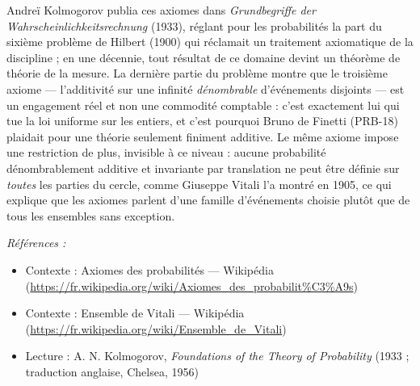 \documentclass[11pt]{article}
\newenvironment{refs}{\par\small\noindent\emph{Références :}\begin{itemize}\setlength\itemsep{0pt}}{\end{itemize}\normalsize}
\begin{document}
\noindent Andreï Kolmogorov publia ces axiomes dans \textit{Grundbegriffe der
Wahrscheinlichkeitsrechnung} (1933), réglant pour les probabilités la part du sixième problème
de Hilbert (1900) qui réclamait un traitement axiomatique de la discipline ; en une décennie, tout
résultat de ce domaine devint un théorème de théorie de la mesure. La dernière partie du problème
montre que le troisième axiome --- l'additivité sur une infinité \textit{dénombrable} d'événements
disjoints --- est un engagement réel et non une commodité comptable : c'est exactement lui qui tue
la loi uniforme sur les entiers, et c'est pourquoi Bruno de Finetti (PRB-18) plaidait pour une
théorie seulement finiment additive. Le même axiome impose une restriction de plus, invisible à ce
niveau : aucune probabilité dénombrablement additive et invariante par translation ne peut être
définie sur \textit{toutes} les parties du cercle, comme Giuseppe Vitali l'a montré en 1905, ce qui
explique que les axiomes parlent d'une famille d'événements choisie plutôt que de tous les
ensembles sans exception.

\begin{refs}
\item Contexte : Axiomes des probabilités --- Wikipédia (\url{https://fr.wikipedia.org/wiki/Axiomes_des_probabilit%C3%A9s})
\item Contexte : Ensemble de Vitali --- Wikipédia (\url{https://fr.wikipedia.org/wiki/Ensemble_de_Vitali})
\item Lecture : A. N. Kolmogorov, \textit{Foundations of the Theory of Probability} (1933 ; traduction anglaise, Chelsea, 1956)
\end{refs}

\bigskip
\end{document}
